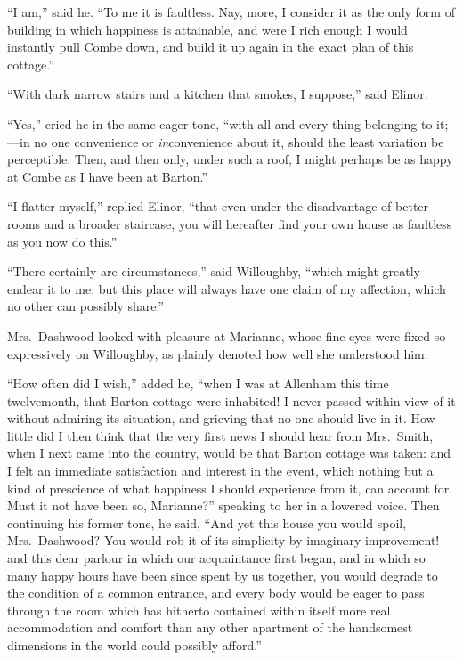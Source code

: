 ``I am,'' said he.  ``To me it is faultless.  Nay, more,
I consider it as the only form of building in which happiness
is attainable, and were I rich enough I would instantly pull
Combe down, and build it up again in the exact plan of this
cottage.''

``With dark narrow stairs and a kitchen that smokes,
I suppose,'' said Elinor.

``Yes,'' cried he in the same eager tone, ``with all
and every thing belonging to it;---in no one convenience
or \emph{in}convenience about it, should the least variation
be perceptible.  Then, and then only, under such a roof, I
might perhaps be as happy at Combe as I have been at Barton.''

``I flatter myself,'' replied Elinor, ``that even under
the disadvantage of better rooms and a broader staircase,
you will hereafter find your own house as faultless as you
now do this.''

``There certainly are circumstances,'' said Willoughby,
``which might greatly endear it to me; but this place will
always have one claim of my affection, which no other can
possibly share.''

Mrs.\ Dashwood looked with pleasure at Marianne,
whose fine eyes were fixed so expressively on Willoughby,
as plainly denoted how well she understood him.

``How often did I wish,'' added he, ``when I was at
Allenham this time twelvemonth, that Barton cottage were
inhabited!  I never passed within view of it without admiring
its situation, and grieving that no one should live in it.
How little did I then think that the very first news
I should hear from Mrs.\ Smith, when I next came into
the country, would be that Barton cottage was taken: and I
felt an immediate satisfaction and interest in the event,
which nothing but a kind of prescience of what happiness I
should experience from it, can account for.  Must it not have
been so, Marianne?'' speaking to her in a lowered voice.
Then continuing his former tone, he said, ``And yet this
house you would spoil, Mrs.\ Dashwood?  You would rob it
of its simplicity by imaginary improvement! and this dear
parlour in which our acquaintance first began, and in which
so many happy hours have been since spent by us together,
you would degrade to the condition of a common entrance,
and every body would be eager to pass through the room
which has hitherto contained within itself more real
accommodation and comfort than any other apartment of
the handsomest dimensions in the world could possibly afford.''

